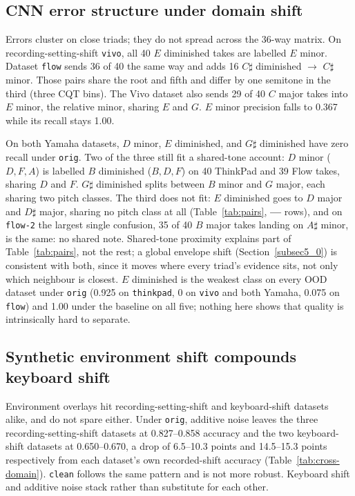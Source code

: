 \documentclass[pdflatex,sn-mathphys-num,iicol]{sn-jnl}
\theoremstyle{thmstyleone}
\theoremstyle{thmstyletwo}
\theoremstyle{thmstylethree}
\begin{document}
\subsection{CNN error structure under domain shift}\label{subsec5_1}

Errors cluster on close triads; they do not spread across the 36-way matrix. On recording-setting-shift \texttt{vivo}, all 40 $E$ diminished takes are labelled $E$ minor. Dataset \texttt{flow} sends 36 of 40 the same way and adds 16 $C\sharp$ diminished $\to$ $C\sharp$ minor. Those pairs share the root and fifth and differ by one semitone in the third (three CQT bins). The Vivo dataset also sends 29 of 40 $C$ major takes into $E$ minor, the relative minor, sharing $E$ and $G$. $E$ minor precision falls to 0.367 while its recall stays 1.00.

On both Yamaha datasets, $D$ minor, $E$ diminished, and $G\sharp$ diminished have zero recall under \texttt{orig}. Two of the three still fit a shared-tone account: $D$ minor ($D,F,A$) is labelled $B$ diminished ($B,D,F$) on 40 ThinkPad and 39 Flow takes, sharing $D$ and $F$. $G\sharp$ diminished splits between $B$ minor and $G$ major, each sharing two pitch classes. The third does not fit: $E$ diminished goes to $D$ major and $D\sharp$ major, sharing no pitch class at all (Table~\ref{tab:pairs}, \textbf{---} rows), and on \texttt{flow-2} the largest single confusion, 35 of 40 $B$ major takes landing on $A\sharp$ minor, is the same: no shared note. Shared-tone proximity explains part of Table~\ref{tab:pairs}, not the rest; a global envelope shift (Section~\ref{subsec5_0}) is consistent with both, since it moves where every triad's evidence sits, not only which neighbour is closest. $E$ diminished is the weakest class on every OOD dataset under \texttt{orig} (0.925 on \texttt{thinkpad}, 0 on \texttt{vivo} and both Yamaha, 0.075 on \texttt{flow}) and 1.00 under the baseline on all five; nothing here shows that quality is intrinsically hard to separate.

\subsection{Synthetic environment shift compounds keyboard shift}\label{subsec5_2}

Environment overlays hit recording-setting-shift and keyboard-shift datasets alike, and do not spare either. Under \texttt{orig}, additive noise leaves the three recording-setting-shift datasets at 0.827--0.858 accuracy and the two keyboard-shift datasets at 0.650--0.670, a drop of 6.5--10.3 points and 14.5--15.3 points respectively from each dataset's own recorded-shift accuracy (Table~\ref{tab:cross-domain}). \texttt{clean} follows the same pattern and is not more robust. Keyboard shift and additive noise stack rather than substitute for each other.
\end{document}
